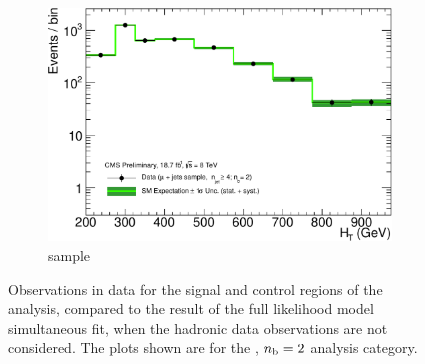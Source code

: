 \begin{figure}[h!]
\begin{subfigure}[b]{0.48\textwidth}
    \includegraphics[width=\textwidth]
    {Figs/results/v0/greenBand/single_plots/muon_2b_ge4j_logy.pdf}
    \caption{\mj sample}
  \end{subfigure}
  \caption{Observations in data for the signal and control
  regions of the analysis, compared to the result of the full likelihood model
  simultaneous fit, when the hadronic data observations are not considered. The
  plots shown are for the \njhigh, $n_{\text{b}} = 2$ analysis category.}
  \label{fig:green_fits_2b_ge4j}
\end{figure}


